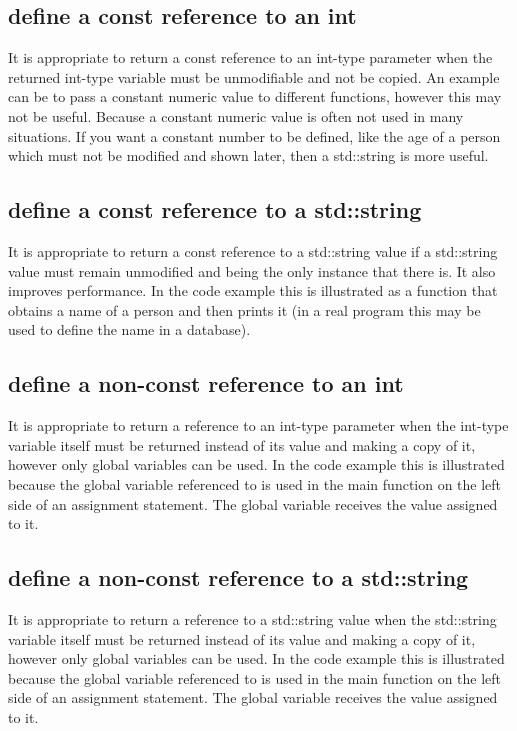 \documentclass[a4paper]{article}
\begin{document}
\subsection*{define a const reference to an int}
It is appropriate to return a const reference to an int-type parameter when the returned int-type variable must be unmodifiable and not be copied. An example can be to pass a constant numeric value to different functions, however this may not be useful. Because a constant numeric value is often not used in many situations. If you want a constant number to be defined, like the age of a person which must not be modified and shown later, then a std::string is more useful.
\subsection*{define a const reference to a std::string}
It is appropriate to return a const reference to a std::string value if a std::string value must remain unmodified and being the only instance that there is. It also improves performance. In the code example this is illustrated as a function that obtains a name of a person and then prints it (in a real program this may be used to define the name in a database).

\subsection*{define a non-const reference to an int}
It is appropriate to return a reference to an int-type parameter when the int-type variable itself must be returned instead of its value and making a copy of it, however only global variables can be used. In the code example this is illustrated because the global variable referenced to is used in the main function on the left side of an assignment statement. The global variable receives the value assigned to it.

\subsection*{define a non-const reference to a std::string}
It is appropriate to return a reference to a std::string value when the std::string variable itself must be returned instead of its value and making a copy of it, however only global variables can be used. In the code example this is illustrated because the global variable referenced to is used in the main function on the left side of an assignment statement. The global variable receives the value assigned to it.

\end{document}
